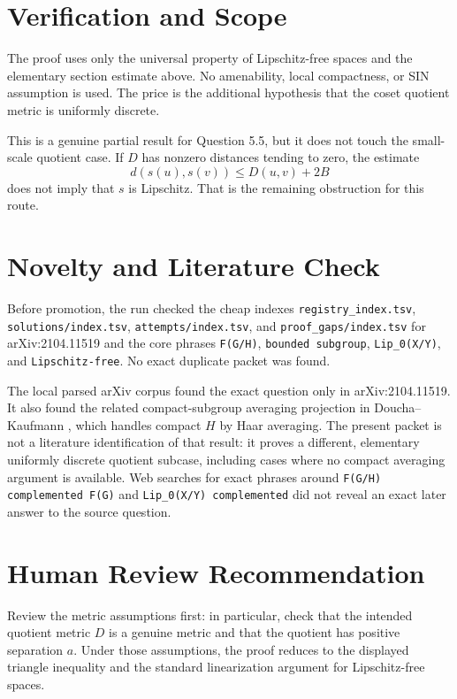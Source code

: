 \documentclass[11pt]{article}
\begin{document}
\section*{Verification and Scope}

The proof uses only the universal property of Lipschitz-free spaces and
the elementary section estimate above. No amenability, local compactness,
or SIN assumption is used. The price is the additional hypothesis that
the coset quotient metric is uniformly discrete.

This is a genuine partial result for Question 5.5, but it does not touch
the small-scale quotient case. If $D$ has nonzero distances tending to
zero, the estimate
\[
  d(s(u),s(v))\le D(u,v)+2B
\]
does not imply that $s$ is Lipschitz. That is the remaining obstruction
for this route.

\section*{Novelty and Literature Check}

Before promotion, the run checked the cheap indexes
\texttt{registry\_index.tsv}, \texttt{solutions/index.tsv},
\texttt{attempts/index.tsv}, and \texttt{proof\_gaps/index.tsv} for
arXiv:2104.11519 and the core phrases
\texttt{F(G/H)}, \texttt{bounded subgroup}, \texttt{Lip\_0(X/Y)}, and
\texttt{Lipschitz-free}. No exact duplicate packet was found.

The local parsed arXiv corpus found the exact question only in
arXiv:2104.11519. It also found the related compact-subgroup averaging
projection in Doucha--Kaufmann \cite{DouchaKaufmann}, which handles
compact $H$ by Haar averaging. The present packet is not a literature
identification of that result: it proves a different, elementary
uniformly discrete quotient subcase, including cases where no compact
averaging argument is available. Web searches for exact phrases around
\texttt{F(G/H) complemented F(G)} and \texttt{Lip\_0(X/Y) complemented}
did not reveal an exact later answer to the source question.

\section*{Human Review Recommendation}

Review the metric assumptions first: in particular, check that the
intended quotient metric $D$ is a genuine metric and that the quotient
has positive separation $a$. Under those assumptions, the proof reduces
to the displayed triangle inequality and the standard linearization
argument for Lipschitz-free spaces.
\end{document}
